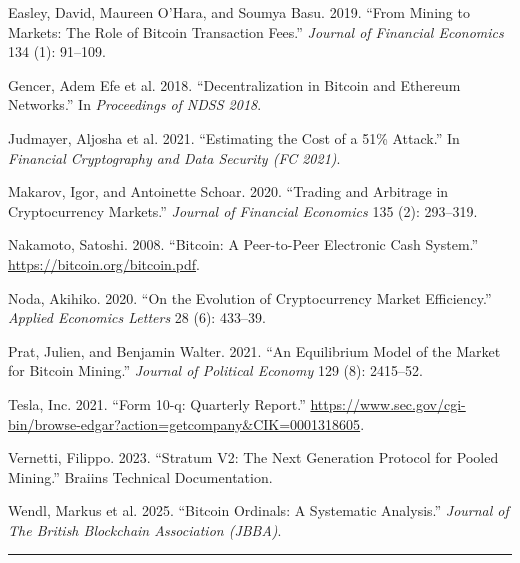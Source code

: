 \documentclass[
  11pt,
]{article}
\newlength{\cslhangindent}
\newlength{\cslentryspacingunit} %
\newenvironment{CSLReferences}[2] %
 {%
  \setlength{\parindent}{0pt}
  \ifodd #1
  \let\oldpar\par
  \def\par{\hangindent=\cslhangindent\oldpar}
  \fi
  \setlength{\parskip}{#2\cslentryspacingunit}
 }%
 {}
\begin{document}
\begin{CSLReferences}{1}{0}
\leavevmode{}%
Easley, David, Maureen O'Hara, and Soumya Basu. 2019. {``From Mining to
Markets: The Role of {Bitcoin} Transaction Fees.''} \emph{Journal of
Financial Economics} 134 (1): 91--109.

\leavevmode{}%
Gencer, Adem Efe et al. 2018. {``Decentralization in {Bitcoin} and
{Ethereum} Networks.''} In \emph{Proceedings of NDSS 2018}.

\leavevmode{}%
Judmayer, Aljosha et al. 2021. {``Estimating the Cost of a 51\%
Attack.''} In \emph{Financial Cryptography and Data Security (FC 2021)}.

\leavevmode{}%
Makarov, Igor, and Antoinette Schoar. 2020. {``Trading and Arbitrage in
Cryptocurrency Markets.''} \emph{Journal of Financial Economics} 135
(2): 293--319.

\leavevmode{}%
Nakamoto, Satoshi. 2008. {``Bitcoin: A Peer-to-Peer Electronic Cash
System.''} \url{https://bitcoin.org/bitcoin.pdf}.

\leavevmode{}%
Noda, Akihiko. 2020. {``On the Evolution of Cryptocurrency Market
Efficiency.''} \emph{Applied Economics Letters} 28 (6): 433--39.

\leavevmode{}%
Prat, Julien, and Benjamin Walter. 2021. {``An Equilibrium Model of the
Market for {Bitcoin} Mining.''} \emph{Journal of Political Economy} 129
(8): 2415--52.

\leavevmode{}%
Tesla, Inc. 2021. {``Form 10-q: Quarterly Report.''}
\url{https://www.sec.gov/cgi-bin/browse-edgar?action=getcompany\&CIK=0001318605}.

\leavevmode{}%
Vernetti, Filippo. 2023. {``Stratum {V2}: The Next Generation Protocol
for Pooled Mining.''} Braiins Technical Documentation.

\leavevmode{}%
Wendl, Markus et al. 2025. {``Bitcoin {Ordinals}: A Systematic
Analysis.''} \emph{Journal of The British Blockchain Association
(JBBA)}.

\end{CSLReferences}

\begin{center}\rule{0.5\linewidth}{0.5pt}\end{center}
\end{document}

